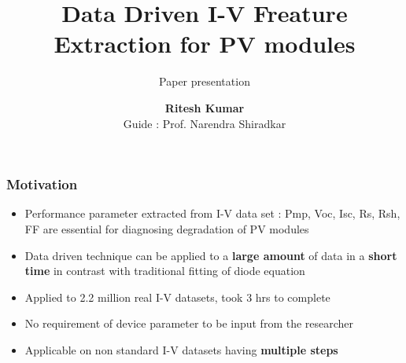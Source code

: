 \documentclass{beamer}
\title[DDP Phase 1]{\textbf{\large Data Driven I-V Freature Extraction for PV modules}}
\subtitle{Paper presentation}
\author [Ritesh Kumar]{\textbf{Ritesh Kumar} \\ Guide : Prof. Narendra Shiradkar}
\institute[IITB]{Electrical Engineering \\ IIT Bombay}
\newcommand\Fontvi{\fontsize{7.3}{7}\selectfont}
\begin{document}
	\begin{frame}[t]
		\titlepage
	\end{frame}

	\begin{frame}
	\frametitle{Motivation}
		\begin{itemize}
			\item Performance parameter extracted from I-V data set : Pmp, Voc, Isc, Rs, Rsh, FF are essential for diagnosing degradation of PV modules
			\item Data driven technique can be applied to a \textbf{large amount} of data in a \textbf{short time} in contrast with traditional fitting of diode equation
			\item Applied to 2.2 million real I-V datasets, took 3 hrs to complete
			\item No requirement of device parameter to be input from the researcher
			\item Applicable on non standard I-V datasets having \textbf{multiple steps}
		\end{itemize}
	\end{frame}
\end{document}
